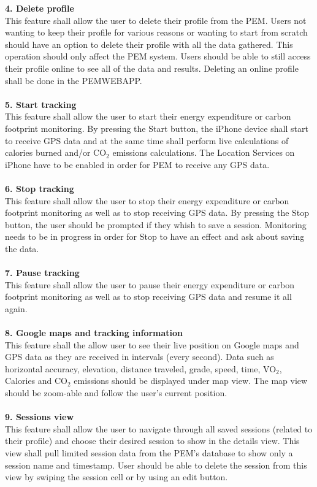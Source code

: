 \documentclass[12pt, a4paper]{report}   %
\begin{document}
\begin{enumerate}
\textbf{4. Delete profile}\\
This feature shall allow the user to delete their profile from the PEM. Users not wanting to keep their profile for various reasons or wanting to start from scratch should have an option to delete their profile with all the data gathered. This operation should only affect the PEM system. Users should be able to still access their profile online to see all of the data and results. Deleting an online profile shall be done in the PEMWEBAPP.\\ \\
\textbf{5. Start tracking}\\
This feature shall allow the user to start their energy expenditure or carbon footprint monitoring. By pressing the Start button, the iPhone device shall start to receive GPS data and at the same time shall perform live calculations of calories burned and/or CO$_{2}$ emissions calculations. The Location Services on iPhone have to be enabled in order for PEM to receive any GPS data.\\ \\
\textbf{6. Stop tracking}\\
This feature shall allow the user to stop their energy expenditure or carbon footprint monitoring as well as to stop receiving GPS data. By pressing the Stop button, the user should be prompted if they whish to save a session. Monitoring needs to be in progress in order for Stop to have an effect and ask about saving the data.\\ \\
\textbf{7. Pause tracking}\\
This feature shall allow the user to pause their energy expenditure or carbon footprint monitoring as well as to stop receiving GPS data and resume it all again.\\ \\
\textbf{8. Google maps and tracking information}\\
This feature shall the allow user to see their live position on Google maps and GPS data as they are received in intervals (every second). Data such as horizontal accuracy, elevation, distance traveled, grade, speed, time, VO$_{2}$, Calories and CO$_{2}$ emissions should be displayed under map view. The map view should be zoom-able and follow the user's current position.\\ \\
\textbf{9. Sessions view}\\
This feature shall allow the user to navigate through all saved sessions (related to their profile) and choose their desired session to show in the details view. This view shall pull limited session data from the PEM's database to show only a session name and timestamp. User should be able to delete the session from this view by swiping the session cell or by using an edit button.\\ \\

\end{enumerate}
\end{document}
